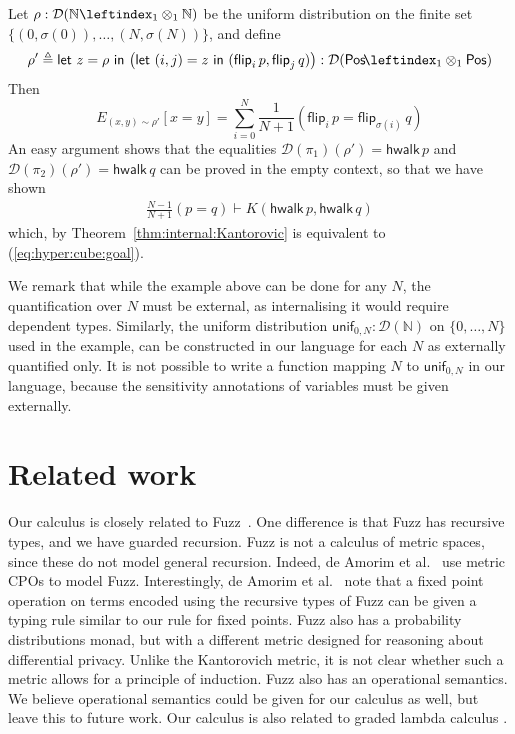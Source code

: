 \documentclass[a4paper,UKenglish,cleveref, autoref, thm-restate]{lipics-v2021}
\newcommand{\nat}{\mathbb{N}}
\newcommand{\D}{\mathcal{D}}
\newcommand{\pair}[2]{\otimes_{#1,#2}}
\renewcommand{\pair}[2]{\leftindex_{#1}\otimes_{#2}} %
\newcommand{\ts}{\vdash}
\newcommand{\Pos}{\mathsf{Pos}}
\newcommand{\flip}{\mathsf{flip}}
\newcommand{\unifZN}{\mathsf{unif}_{0,N}}
\newcommand{\hwalk}{\mathsf{hwalk}}
\newcommand{\bij}{\sigma}
\newcommand{\letIn}[2]{\mathsf{let~} #1 \mathsf{~in~} #2}
\newcommand{\mean}[3]{E_{#1 \sim #2}[#3]}
\newcommand{\TD}{\mathcal{D}}
\newcommand{\kant}[2]{K(#1,#2)}
\newcommand{\peq}{=}
\newcommand{\defeq}{\triangleq}
\begin{document}
Let $\rho : \D(\nat\pair11\nat)$ be the uniform distribution on the finite set $\{(0,\bij (0)), \dots, (N,\bij (N))\}$, 
and define 
\[
\rho' \defeq
\letIn{z = \rho}{\big(\letIn{(i,j) = z}{(\flip_i \,p, \flip_{j}\,q)}\big)}
: \D(\Pos\!\pair11 \Pos)
\]
Then 
\[
\mean{(x,y)}{\rho'}{x\peq y} = \sum_{i=0}^N\frac1{N\!+\!1}(\flip_i\,p \peq \flip_{\bij(i)}\,q)
\]
An easy argument shows that the equalities $\D(\pi_1)(\rho') \peq \hwalk\,p$ and $\D(\pi_2)(\rho') \peq \hwalk\,q$
can be proved in the empty context, so that we have shown 
\begin{align*}
 \frac{N-1}{N+1}(p \peq q) \ts 
 \kant{\hwalk\,p}{\hwalk\,q}
\end{align*}
which, by Theorem~\ref{thm:internal:Kantorovic} is equivalent to (\ref{eq:hyper:cube:goal}). 

\begin{remark} \label{rem:limitations}
We remark that while the example above can be done for any $N$, the quantification over $N$ must be external, as internalising
it would require dependent types. Similarly, the uniform distribution $\unifZN : \TD(\nat)$ on $\{0,\dots, N\}$ used in the example,
can be constructed in our language for each $N$ as externally quantified only. It is not possible to write a function mapping $N$ to 
$\unifZN$ in our language, because the sensitivity annotations of variables must be given externally.
\end{remark}


\section{Related work}
\label{sec:related}

Our calculus is closely related to Fuzz~\cite{ReedP10}. 
One difference is that Fuzz has recursive types,
and we have guarded recursion. Fuzz is not a calculus of metric spaces, since these
do not model general recursion. Indeed, de Amorim et al.~\cite{AmorimGHKC17} use metric CPOs to model Fuzz.
Interestingly, de Amorim et al.~\cite{AmorimGHKC17} note that a fixed point operation on terms encoded using 
the recursive types of Fuzz can be given a typing rule similar to our rule for fixed points. 
Fuzz also has a probability distributions monad, but with a different metric designed
for reasoning about differential privacy. 
Unlike the Kantorovich metric, it is not clear whether such a metric allows for a principle of induction.
Fuzz also has an operational semantics. We believe operational semantics could be given for our calculus as
well, but leave this to future work. 
Our calculus is also related to graded lambda calculus \cite{BrunelGMZ14, GaboardiKOBU16}.
\end{document}
